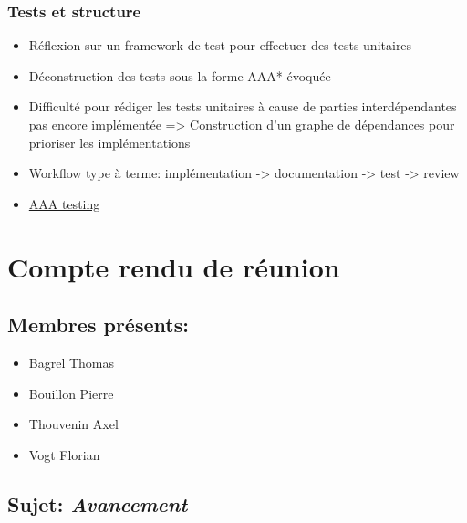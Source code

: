\documentclass[a4paper, 12pt]{report}
\begin{document}
\subsubsection{Tests et structure}

\begin{itemize}

\item
  Réflexion sur un framework de test pour effectuer des tests unitaires
\item
  Déconstruction des tests sous la forme AAA* évoquée
\item
  Difficulté pour rédiger les tests unitaires à cause de parties
  interdépendantes pas encore implémentée =\textgreater{} Construction
  d'un graphe de dépendances pour prioriser les implémentations
\item
  Workflow type à terme: implémentation -\textgreater{} documentation
  -\textgreater{} test -\textgreater{} review
\end{itemize}

\begin{itemize}

\item
  \href{https://www.c-sharpcorner.com/UploadFile/dacca2/fundamental-of-unit-testing-understand-aaa-in-unit-testing/}{AAA
  testing}
\end{itemize}


\section{Compte rendu de réunion }

\subsection*{Membres présents:}

\begin{itemize}

\item
  Bagrel Thomas
\item
  Bouillon Pierre
\item
  Thouvenin Axel
\item
  Vogt Florian
\end{itemize}

\subsection*{Sujet: \emph{Avancement}}
\end{document}
